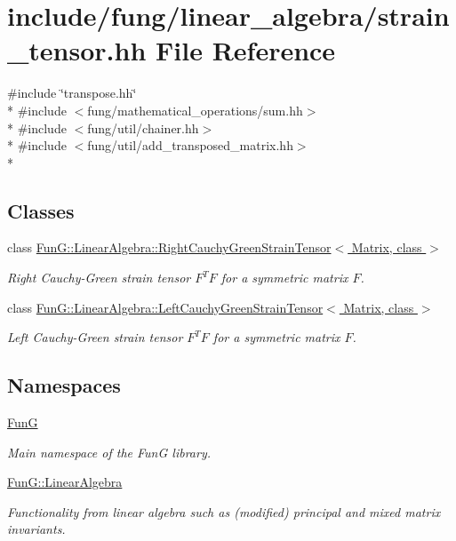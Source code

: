 \hypertarget{strain__tensor_8hh}{}\section{include/fung/linear\+\_\+algebra/strain\+\_\+tensor.hh File Reference}
\label{strain__tensor_8hh}
{\ttfamily \#include \char`\"{}transpose.\+hh\char`\"{}}\\*
{\ttfamily \#include $<$fung/mathematical\+\_\+operations/sum.\+hh$>$}\\*
{\ttfamily \#include $<$fung/util/chainer.\+hh$>$}\\*
{\ttfamily \#include $<$fung/util/add\+\_\+transposed\+\_\+matrix.\+hh$>$}\\*
\subsection*{Classes}
\begin{DoxyCompactItemize}
\item 
class \hyperlink{classFunG_1_1LinearAlgebra_1_1RightCauchyGreenStrainTensor}{Fun\+G\+::\+Linear\+Algebra\+::\+Right\+Cauchy\+Green\+Strain\+Tensor$<$ Matrix, class $>$}
\begin{DoxyCompactList}\small\item\em Right Cauchy-\/\+Green strain tensor $ F^T F $ for a symmetric matrix $ F $. \end{DoxyCompactList}\item 
class \hyperlink{classFunG_1_1LinearAlgebra_1_1LeftCauchyGreenStrainTensor}{Fun\+G\+::\+Linear\+Algebra\+::\+Left\+Cauchy\+Green\+Strain\+Tensor$<$ Matrix, class $>$}
\begin{DoxyCompactList}\small\item\em Left Cauchy-\/\+Green strain tensor $ F^T F $ for a symmetric matrix $ F $. \end{DoxyCompactList}\end{DoxyCompactItemize}
\subsection*{Namespaces}
\begin{DoxyCompactItemize}
\item 
 \hyperlink{namespaceFunG}{FunG}
\begin{DoxyCompactList}\small\item\em Main namespace of the FunG library. \end{DoxyCompactList}\item 
 \hyperlink{namespaceFunG_1_1LinearAlgebra}{Fun\+G\+::\+Linear\+Algebra}
\begin{DoxyCompactList}\small\item\em Functionality from linear algebra such as (modified) principal and mixed matrix invariants. \end{DoxyCompactList}\end{DoxyCompactItemize}
